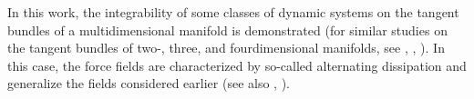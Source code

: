 \documentclass[12pt]{llncs}
\begin{document}
In this work, the integrability of some classes of
dynamic systems on the tangent bundles of a multidimensional
manifold is demonstrated (for similar studies
on the tangent bundles of two-, three, and fourdimensional
manifolds, see \cite{3}, \cite{4}, \cite{5}). In this case, the force fields are characterized by so-called alternating
dissipation and generalize the fields considered earlier
(see also \cite{6}, \cite{7}). 


%

\end{document}
